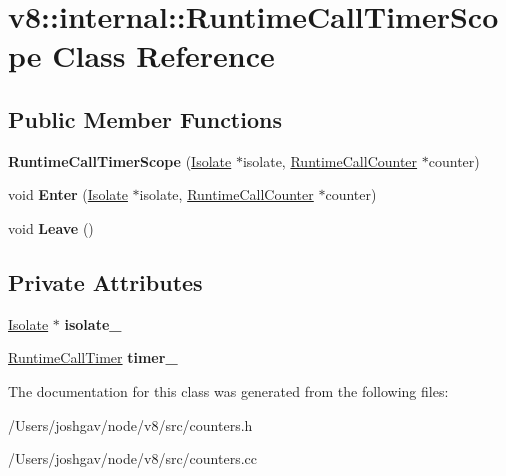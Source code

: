 \hypertarget{classv8_1_1internal_1_1_runtime_call_timer_scope}{}\section{v8\+:\+:internal\+:\+:Runtime\+Call\+Timer\+Scope Class Reference}
\label{classv8_1_1internal_1_1_runtime_call_timer_scope}
\subsection*{Public Member Functions}
\begin{DoxyCompactItemize}
\item 
{\bfseries Runtime\+Call\+Timer\+Scope} (\hyperlink{classv8_1_1internal_1_1_isolate}{Isolate} $\ast$isolate, \hyperlink{structv8_1_1internal_1_1_runtime_call_counter}{Runtime\+Call\+Counter} $\ast$counter)\hypertarget{classv8_1_1internal_1_1_runtime_call_timer_scope_aebfc8745600f4ec63e604752eeea1c52}{}\label{classv8_1_1internal_1_1_runtime_call_timer_scope_aebfc8745600f4ec63e604752eeea1c52}

\item 
void {\bfseries Enter} (\hyperlink{classv8_1_1internal_1_1_isolate}{Isolate} $\ast$isolate, \hyperlink{structv8_1_1internal_1_1_runtime_call_counter}{Runtime\+Call\+Counter} $\ast$counter)\hypertarget{classv8_1_1internal_1_1_runtime_call_timer_scope_ac92abff201ccb926fa70e2283016777a}{}\label{classv8_1_1internal_1_1_runtime_call_timer_scope_ac92abff201ccb926fa70e2283016777a}

\item 
void {\bfseries Leave} ()\hypertarget{classv8_1_1internal_1_1_runtime_call_timer_scope_ad5c1fbbf07a0a8588f7f5f81aa99cc5b}{}\label{classv8_1_1internal_1_1_runtime_call_timer_scope_ad5c1fbbf07a0a8588f7f5f81aa99cc5b}

\end{DoxyCompactItemize}
\subsection*{Private Attributes}
\begin{DoxyCompactItemize}
\item 
\hyperlink{classv8_1_1internal_1_1_isolate}{Isolate} $\ast$ {\bfseries isolate\+\_\+}\hypertarget{classv8_1_1internal_1_1_runtime_call_timer_scope_a5e3e45f1ea69db0889fd2192798582c3}{}\label{classv8_1_1internal_1_1_runtime_call_timer_scope_a5e3e45f1ea69db0889fd2192798582c3}

\item 
\hyperlink{classv8_1_1internal_1_1_runtime_call_timer}{Runtime\+Call\+Timer} {\bfseries timer\+\_\+}\hypertarget{classv8_1_1internal_1_1_runtime_call_timer_scope_a53f45ba6fccbc55b65831049a059fcec}{}\label{classv8_1_1internal_1_1_runtime_call_timer_scope_a53f45ba6fccbc55b65831049a059fcec}

\end{DoxyCompactItemize}


The documentation for this class was generated from the following files\+:\begin{DoxyCompactItemize}
\item 
/\+Users/joshgav/node/v8/src/counters.\+h\item 
/\+Users/joshgav/node/v8/src/counters.\+cc\end{DoxyCompactItemize}
